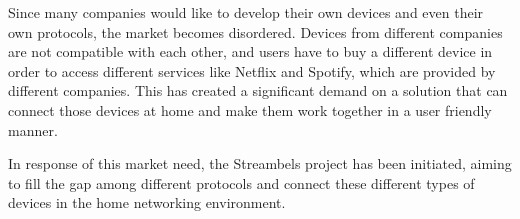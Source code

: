 Since many companies would like to develop their own devices and even their 
own protocols, the market becomes disordered. Devices from different companies
are not compatible with each other, and users have to buy a different device in
order to access different services like Netflix and Spotify, which are provided
by different companies. This has created a significant demand on a solution that
can connect those devices at home and make them work together in a user friendly manner.

In response of this market need, the Streambels project has been initiated,
aiming to fill the gap among different protocols and connect these different
types of devices in the home networking environment.
